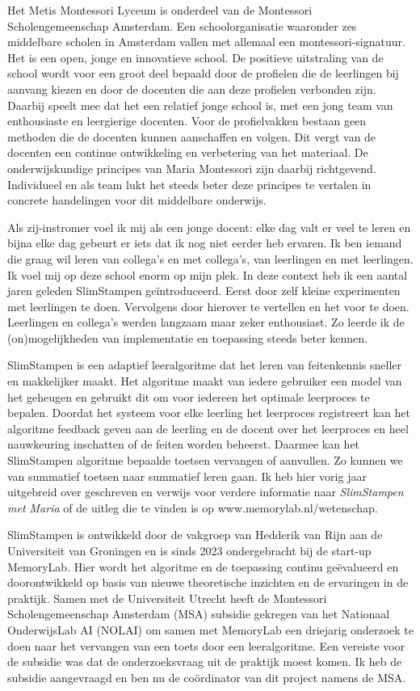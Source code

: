 \documentclass[12pt, a4paper]{article}
\begin{document}
Het Metis Montessori Lyceum is onderdeel van de Montessori Scholengemeenschap Amsterdam. Een schoolorganisatie waaronder zes middelbare scholen in Amsterdam vallen met allemaal een montessori-signatuur.
Het is een open, jonge en innovatieve school. De positieve uitstraling van de school wordt voor een groot deel bepaald door de profielen die de leerlingen bij aanvang kiezen en door de docenten die aan deze profielen verbonden zijn. Daarbij speelt mee dat het een relatief jonge school is, met een jong team van enthousiaste en leergierige docenten. Voor de profielvakken bestaan geen methoden die de docenten kunnen aanschaffen en volgen. Dit vergt van de docenten een continue ontwikkeling en verbetering van het materiaal. De onderwijskundige principes van Maria Montessori zijn daarbij richtgevend. Individueel en als team lukt het steeds beter deze principes te vertalen in concrete handelingen voor dit middelbare onderwijs.

Als zij-instromer voel ik mij als een jonge docent: elke dag valt er veel te leren en bijna elke dag gebeurt er iets dat ik nog niet eerder heb ervaren. Ik ben iemand die graag wil leren van collega’s en met collega’s, van leerlingen en met leerlingen. Ik voel mij  op deze school enorm op mijn plek. In deze context heb ik een aantal jaren geleden SlimStampen geïntroduceerd. Eerst door zelf kleine experimenten met leerlingen te doen. Vervolgens door hierover te vertellen en het voor te doen. Leerlingen en collega’s werden langzaam maar zeker enthousiast. Zo leerde ik de (on)mogelijkheden van implementatie en toepassing steeds beter kennen.

SlimStampen is een adaptief leeralgoritme dat het leren van feitenkennis sneller en makkelijker maakt. Het algoritme maakt van iedere gebruiker een model van het geheugen en gebruikt dit om voor iedereen het optimale leerproces te bepalen. Doordat het systeem voor elke leerling het leerproces registreert kan het algoritme feedback geven aan de leerling en de docent over het leerproces en heel nauwkeuring inschatten of de feiten worden beheerst. Daarmee kan het SlimStampen algoritme bepaalde toetsen vervangen of aanvullen. Zo kunnen we van summatief toetsen naar summatief leren gaan. Ik heb hier vorig jaar uitgebreid over geschreven en verwijs voor verdere informatie naar \emph{SlimStampen met Maria} \cite[]{Marijn23} of de uitleg die te vinden is op www.memorylab.nl/wetenschap.

SlimStampen is ontwikkeld door de vakgroep van Hedderik van Rijn aan de Universiteit van Groningen en is sinds 2023 ondergebracht bij de start-up MemoryLab. Hier wordt het algoritme en de toepassing continu geëvalueerd en doorontwikkeld op basis van nieuwe theoretische inzichten en de ervaringen in de praktijk. Samen met de Universiteit Utrecht heeft de Montessori Scholengemeenschap Amsterdam (MSA) subsidie gekregen van het Nationaal OnderwijsLab AI (NOLAI) om samen met MemoryLab een driejarig onderzoek te doen naar het vervangen van een toets door een leeralgoritme. Een vereiste voor de subsidie was dat de onderzoeksvraag uit de praktijk moest komen. Ik heb de subsidie aangevraagd en ben nu de coördinator van dit project namens de MSA.
\end{document}
